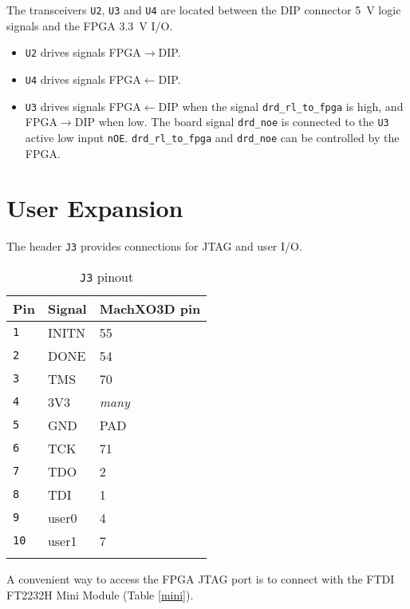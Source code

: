 \documentclass[10pt]{datasheet}
\begin{document}
The transceivers \texttt{U2}, \texttt{U3} and \texttt{U4} are located between
the DIP connector \SI{5}{V} logic signals and the FPGA \SI{3.3}{V} I/O.

\begin{itemize}
\item{\texttt{U2} drives signals FPGA$\rightarrow$DIP.}
\item{\texttt{U4} drives signals FPGA$\leftarrow$DIP.}
\item{\texttt{U3} drives signals FPGA$\leftarrow$DIP when the signal
\texttt{drd\_rl\_to\_fpga} is high, and FPGA$\rightarrow$DIP when low.
The board signal \texttt{drd\_noe} is connected to the \texttt{U3} active low input
\texttt{nOE}.
\texttt{drd\_rl\_to\_fpga} and
\texttt{drd\_noe}
can be controlled by the FPGA.}
\end{itemize}

\clearpage
\section{User Expansion}
\label{user}

The header \texttt{J3} provides connections for JTAG and user I/O.

\begin{table}[H]
\caption{\texttt{J3} pinout}
\label{j3pin}
\begin{tabular}[c]{ l l l }
    \thickhline
    \textbf{Pin} & \textbf{Signal} & \textbf{MachXO3D pin}\\
    \hline
    \texttt{1}  & INITN & 55 \\
    \texttt{2}  & DONE  & 54 \\
    \texttt{3}  & TMS   & 70 \\
    \texttt{4}  & 3V3   & \textit{many} \\
    \texttt{5}  & GND   & PAD \\
    \texttt{6}  & TCK   & 71 \\
    \texttt{7}  & TDO   & 2 \\
    \texttt{8}  & TDI   & 1 \\
    \texttt{9}  & user0 & 4 \\
    \texttt{10} & user1 & 7 \\
    \thickhline
\end{tabular}
\end{table}

A convenient way to access the FPGA JTAG port is to connect with
the FTDI FT2232H Mini Module (Table \ref{mini}).
\end{document}
